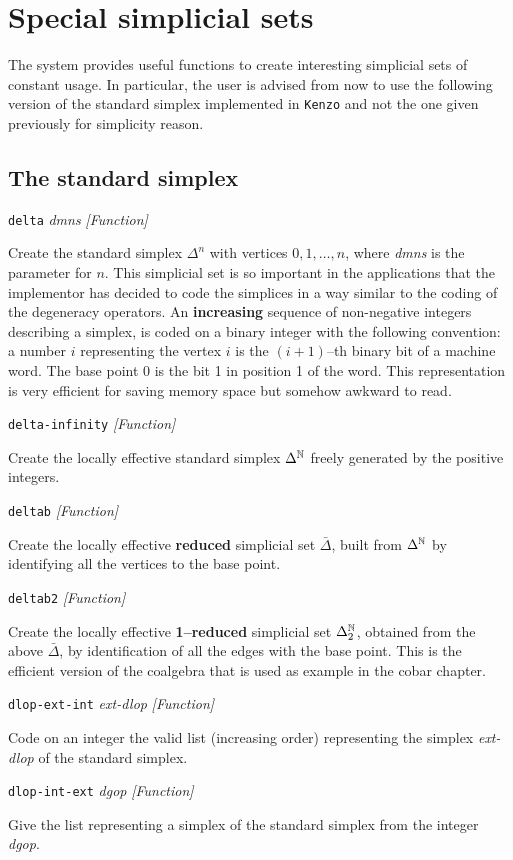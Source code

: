 \section {Special simplicial sets}

The system provides useful functions to create interesting simplicial sets of constant usage.
In particular, the user is advised from now to use the following version of the standard
simplex implemented in {\tt Kenzo} and not the one given previously for simplicity reason.

\subsection {The standard simplex}
{\parindent=0mm
{\leftskip=5mm
{\tt delta} {\em dmns} \hfill {\em [Function]} \par}
{\leftskip=15mm
Create the standard simplex $\Delta^n$ with vertices $0,1,\ldots,n$,
where {\em dmns} is the parameter for $n$.
This simplicial set is so important in the applications that
the implementor has decided to code the simplices in a  way similar to the coding
of the degeneracy operators.
An {\bf increasing} sequence of non-negative integers describing a simplex, is coded
on a binary integer with the following convention: a number $i$ representing the vertex $i$
is the $(i+1)$--th binary bit of a machine word. The base point $0$ is the bit 1 in position 1 of the
word. This representation is very efficient for saving memory space but somehow awkward to read. \par}
{\leftskip=5mm
{\tt delta-infinity} \hfill {\em [Function]} \par}
{\leftskip=15mm
Create the locally effective standard simplex $\Delta^{{\mathbb{N}}}$ freely generated by the positive integers. \par}
{\leftskip=5mm
{\tt deltab} \hfill {\em [Function]} \par}
{\leftskip=15mm
Create the locally effective {\bf reduced} simplicial set $\bar \Delta$, built from
$\Delta^{{\mathbb{N}}}$ by identifying all the vertices to the base point. \par}
{\leftskip=5mm
{\tt deltab2} \hfill {\em [Function]} \par}
{\leftskip=15mm
Create the locally effective {\bf 1--reduced} simplicial set $\Delta_2^{{\mathbb{N}}}$, obtained from the above $\bar \Delta$,
by identification of all the edges with the base point. This is the efficient version of the coalgebra
that is used as example in the cobar chapter. \par}
{\leftskip=5mm
{\tt dlop-ext-int} {\em ext-dlop} \hfill {\em [Function]}\par}
{\leftskip=15mm
Code on an integer the valid list (increasing order) representing the simplex {\em ext-dlop} of the
standard simplex. \par}
{\leftskip=5mm
{\tt dlop-int-ext} {\em dgop} \hfill {\em [Function]}\par}
{\leftskip=15mm
Give the list representing a simplex of the standard simplex from the integer {\em dgop}. \par}
}
